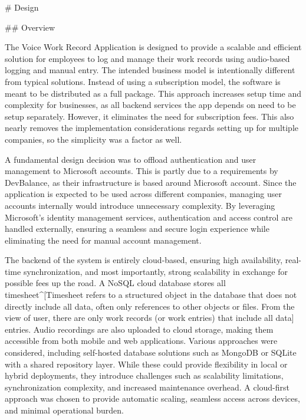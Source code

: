 \documentclass[
  digital,     %
  oneside,     %
  nosansbold,  %
  nocolorbold, %
  lof,         %
  lot,         %
]{fithesis4}
\begin{document}
\shorthandoff{-}
\begin{markdown}

# Design

## Overview

The Voice Work Record Application is designed to provide a scalable and efficient solution for employees to log and manage their work records using audio-based logging and manual entry. The intended business model is intentionally different from typical solutions. Instead of using a subscription model, the software is meant to be distributed as a full package. This approach increases setup time and complexity for businesses, as all backend services the app depends on need to be setup separately. However, it eliminates the need for subscription fees. This also nearly removes the implementation considerations regards setting up for multiple companies, so the simplicity was a factor as well.

A fundamental design decision was to offload authentication and user management to Microsoft accounts. This is partly due to a requirements by DevBalance, as their infrastructure is based around Microsoft account. Since the application is expected to be used across different companies, managing user accounts internally would introduce unnecessary complexity. By leveraging Microsoft's identity management services, authentication and access control are handled externally, ensuring a seamless and secure login experience while eliminating the need for manual account management.

The backend of the system is entirely cloud-based, ensuring high availability, real-time synchronization, and most importantly, strong scalability in exchange for possible fees up the road. A NoSQL cloud database stores all timesheet^[Timesheet refers to a structured object in the database that does not directly include all data, often only references to other objects or files. From the view of user, there are only work records (or work entries) that include all data] entries. Audio recordings are also uploaded to cloud storage, making them accessible from both mobile and web applications. Various approaches were considered, including self-hosted database solutions such as MongoDB or SQLite with a shared repository layer. While these could provide flexibility in local or hybrid deployments, they introduce challenges such as scalability limitations, synchronization complexity, and increased maintenance overhead. A cloud-first approach was chosen to provide automatic scaling, seamless access across devices, and minimal operational burden.


\end{markdown}
\end{document}
